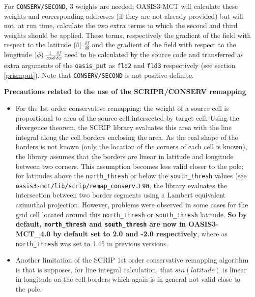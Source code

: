 \begin{itemize}
\begin{itemize}
\begin{itemize}
      For {\tt CONSERV/SECOND}, 3 weights are needed; OASIS3-MCT will
      calculate these weights and corresponding addresses (if they are
      not already provided) but will not, at run time, calculate the
      two extra terms to which the second and third weights should be
      applied. These terms, respectively the gradient of the field
      with respect to the latitude ($\theta$) $\frac{\delta f}{\delta
        \theta}$ and the gradient of the field with respect to the
      longitude ($\phi$) $\frac{1}{cos \theta}\frac{\delta f}{\delta
        \phi}$ need to be calculated by the source code and transferred
      as extra arguments of the {\tt oasis\_put} as {\tt fld2} and {\tt fld3}
      respectively (see section \ref{prismput}). Note that {\tt CONSERV/SECOND} is
      not positive definite.

    \end{itemize}

  \end{itemize}

  {\bf Precautions related to the use of the SCRIPR/CONSERV remapping}

  \begin{itemize}

  \item For the 1st order conservative remapping: the weight of a
    source cell is proportional to area of the source cell intersected
    by target cell.  Using the divergence theorem, the SCRIP library
    evaluates this area with the line integral along the cell borders
    enclosing the area. As the real shape of the borders is not known
    (only the location of the corners of each cell is known), the
    library assumes that the borders are linear in latitude and
    longitude between two corners.  This assumption becomes less valid
    closer to the pole; for latitudes above the {\tt north\_thresh}
    or below the {\tt south\_thresh} values (see {\tt
      oasis3-mct/lib/scrip/remap\_conserv.F90}, the library evaluates
    the intersection between two border segments using a Lambert
    equivalent azimuthal projection. However, problems were observed in some
    cases for the grid cell located around this {\tt north\_thresh} or
    {\tt south\_thresh} latitude. {\bf So by default, {\tt north\_thresh} and
    {\tt south\_thresh} are now in OASIS3-MCT\_4.0 by default set to 2.0 and -2.0 respectively}, where as {\tt north\_thresh} was set to 1.45 in previous versions.

  \item Another limitation of the SCRIP 1st order conservative
    remapping algorithm is that is supposes, for line integral
    calculation, that $sin(latitude)$ is linear in longitude on the
    cell borders which again is in general not valid close to the
    pole.


\end{itemize}
\end{itemize}
